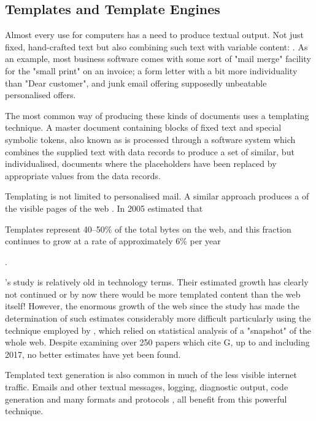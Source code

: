 \subsection{Templates and Template Engines}
Almost every use for computers has a need to produce textual output. Not just fixed, hand-crafted text but also combining such text with variable content:  \citep{Rodgers1999}. As an example, most business software comes with some sort of "mail merge" facility for the "small print" on an invoice; a form letter with a bit more individuality than "Dear customer", and junk email offering supposedly unbeatable personalised offers.

The most common way of producing these kinds of documents uses a templating technique. A master document containing blocks of fixed text and special symbolic tokens, also known as  \citep{Arnoldus2007} is processed through a software system which combines the supplied text with data records to produce a set of similar, but individualised, documents where the placeholders have been replaced by appropriate values from the data records.

Templating is not limited to personalised mail. A similar approach produces a  of the visible pages of the web \citep{Shao-Hua2008}. In 2005 \citeauthor{Gibson2005} estimated that \begin{displayquote}Templates represent 40–50\% of the total bytes on the web, and this fraction continues to grow at a rate of approximately 6\% per year\end{displayquote}. 

\cite{Gibson2005}'s study is relatively old in technology terms. Their estimated growth has clearly not continued or by now there would be more templated content than the web itself! However, the enormous growth of the web since the study has made the determination of such estimates considerably more difficult particularly using the technique employed by \citeauthor{Gibson2005}, which relied on statistical analysis of a "snapshot" of the whole web. Despite examining over 250 papers which cite G\cite{Gibson2005}, up to and including 2017, no better estimates have yet been found.

Templated text generation is also common in much of the less visible internet traffic. Emails and other textual messages, logging, diagnostic output, code generation \citep{Fritzson2009} and many formats and protocols \citep{Barbosa2002}, all benefit from this powerful technique.

